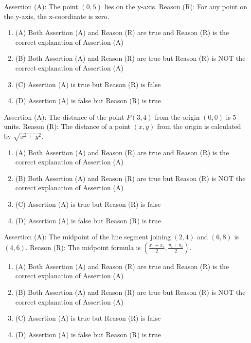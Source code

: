 \documentclass[12pt,a4paper]{exam}
\begin{document}
\begin{questions}
\question[1] Assertion (A): The point $(0, 5)$ lies on the y-axis. Reason (R): For any point on the y-axis, the x-coordinate is zero.
\begin{enumerate}[label=(\Alph*)]
  \item (A) Both Assertion (A) and Reason (R) are true and Reason (R) is the correct explanation of Assertion (A)
  \item (B) Both Assertion (A) and Reason (R) are true but Reason (R) is NOT the correct explanation of Assertion (A)
  \item (C) Assertion (A) is true but Reason (R) is false
  \item (D) Assertion (A) is false but Reason (R) is true
\end{enumerate}
\vspace{0.15cm}

\question[1] Assertion (A): The distance of the point $P(3, 4)$ from the origin $(0, 0)$ is $5$ units. Reason (R): The distance of a point $(x, y)$ from the origin is calculated by $\sqrt{x^2 + y^2}$.
\begin{enumerate}[label=(\Alph*)]
  \item (A) Both Assertion (A) and Reason (R) are true and Reason (R) is the correct explanation of Assertion (A)
  \item (B) Both Assertion (A) and Reason (R) are true but Reason (R) is NOT the correct explanation of Assertion (A)
  \item (C) Assertion (A) is true but Reason (R) is false
  \item (D) Assertion (A) is false but Reason (R) is true
\end{enumerate}
\vspace{0.15cm}

\question[1] Assertion (A): The midpoint of the line segment joining $(2, 4)$ and $(6, 8)$ is $(4, 6)$. Reason (R): The midpoint formula is $(\frac{x_1+x_2}{2}, \frac{y_1+y_2}{2})$.
\begin{enumerate}[label=(\Alph*)]
  \item (A) Both Assertion (A) and Reason (R) are true and Reason (R) is the correct explanation of Assertion (A)
  \item (B) Both Assertion (A) and Reason (R) are true but Reason (R) is NOT the correct explanation of Assertion (A)
  \item (C) Assertion (A) is true but Reason (R) is false
  \item (D) Assertion (A) is false but Reason (R) is true
\end{enumerate}
\vspace{0.15cm}


\end{questions}
\end{document}

